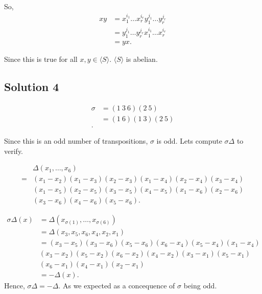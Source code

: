 So,
\begin{align*}
  xy &=x_{1}^{i_{1}}\ldots x_{r}^{i_{r}} y_{1}^{j_{1}}\ldots y_{r}^{j_{r}} \\
  &= y_{1}^{j_{1}}\ldots y_{r}^{j_{r}} x_{1}^{i_{1}}\ldots x_{r}^{i_{r}}\\
  &= yx
.\end{align*}

Since this is true for all \( x,y \in \langle S \rangle \). \( \langle S \rangle \) is abelian.



\subsection{Solution 4}
\begin{align*}
  \sigma &= \left( 1 \: 3 \: 6 \right) \left( 2 \: 5 \right) \\
  &= \left( 1 \: 6 \right) \left( 1 \: 3 \right) \left( 2 \: 5 \right) \\
.\end{align*}

Since this is an odd number of transpositions, \( \sigma  \) is odd. 
Lets compute \( \sigma \Delta\) to verify.

\begin{align*}
  & \Delta \left(x_{1}, \ldots,x_{6}  \right)  \\
  = &\left(x_{1} - x_{2}\right) \left( x_{1} - x_{3} \right) \left( x_{2} - x_{3} \right) \left( x_{1} - x_{4} \right) \left( x_{2} - x_{4} \right) \left( x_{3} - x_{4} \right) \\
    & \left( x_{1} - x_{5} \right) \left( x_{2} - x_{5}   \right) \left( x_{3} - x_{5} \right) \left( x_{4} - x_{5} \right) \left(x_{1} - x_{6}  \right) \left( x_{2} - x_{6} \right) \\
    & \left( x_{3} - x_{6} \right) \left( x_{4} - x_{6} \right) \left( x_{5} - x_{6} \right)
.\end{align*}

\begin{align*}
  \sigma \Delta \left( x \right) &= \Delta \left( x_{\sigma(1)}, \ldots, x_{\sigma(6)} \right) \\
  &= \Delta \left( x_{3}, x_{5}, x_{6}, x_{4}, x_{2}, x_{1}\right) \\
  &= \left(x_{3} - x_{5}\right) \left( x_{3} - x_{6} \right) \left( x_{5} - x_{6} \right) \left( x_{6} - x_{4} \right) \left( x_{5} - x_{4} \right) \left( x_{1} - x_{4} \right) \\
    & \left( x_{3} - x_{2} \right) \left( x_{5} - x_{2}   \right) \left( x_{6} - x_{2} \right) \left( x_{4} - x_{2} \right) \left(x_{3} - x_{1}  \right) \left( x_{5} - x_{1} \right) \\
    & \left( x_{6} - x_{1} \right) \left( x_{4} - x_{1} \right) \left( x_{2} - x_{1} \right) \\
  &= - \Delta  \left( x \right)
.\end{align*}
Hence, \( \sigma \Delta = - \Delta  \). As we expected as a concequence of \( \sigma  \) being odd.

